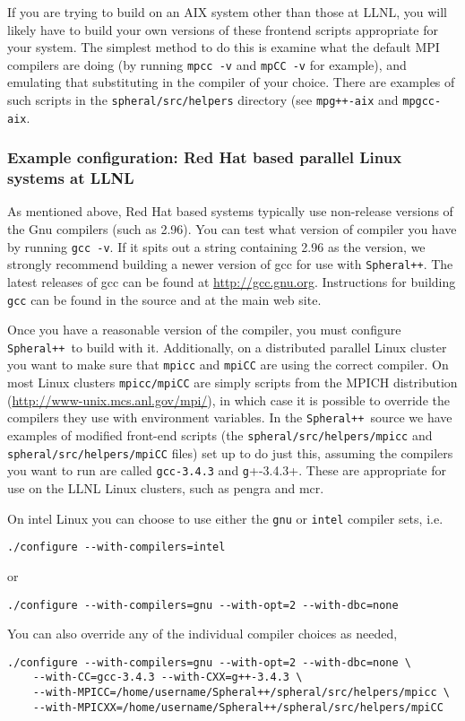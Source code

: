 \documentclass{article}
\newcommand{\Spheral}{{\tt Spheral++}}
\begin{document}
If you are trying to build on an AIX system other than those at LLNL, you will
likely have to build your own versions of these frontend scripts appropriate
for your system.  The simplest method to do this is examine what the default
MPI compilers are doing (by running \verb+mpcc -v+ and \verb+mpCC -v+ for
example), and emulating that substituting in the compiler of your choice.
There are examples of such scripts in the \verb+spheral/src/helpers+ directory
(see \verb.mpg++-aix. and \verb+mpgcc-aix+.

\subsubsection{Example configuration: Red Hat based parallel Linux systems at LLNL}
\label{mcr.sec}

As mentioned above, Red Hat based systems typically use non-release versions of
the Gnu compilers (such as 2.96).  You can test what version of compiler you
have by running \verb+gcc -v+.  If it spits out a string containing 2.96 as the
version, we strongly recommend building a newer version of gcc for use with
\Spheral.  The latest releases of gcc can be found at \url{http://gcc.gnu.org}.
Instructions for building \verb+gcc+ can be found in the source and at the main
web site.

Once you have a reasonable version of the compiler, you must configure
\Spheral\ to build with it.  Additionally, on a distributed parallel Linux
cluster you want to make sure that \verb+mpicc+ and \verb+mpiCC+ are using the
correct compiler.  On most Linux clusters \verb+mpicc/mpiCC+ are simply scripts
from the MPICH distribution (\url{http://www-unix.mcs.anl.gov/mpi/}), in which
case it is possible to override the compilers they use with environment
variables.  In the \Spheral\ source we have examples of modified front-end
scripts (the {\tt spheral/src/helpers/mpicc} and
\verb+spheral/src/helpers/mpiCC+ files) set up to do just this, assuming the
compilers you want to run are called \verb+gcc-3.4.3+ and \verb+g++-3.4.3+.
These are appropriate for use on the LLNL Linux clusters, such as pengra and
mcr.

On intel Linux you can choose to use either the \verb+gnu+ or \verb+intel+
compiler sets, i.e.
\begin{verbatim}
./configure --with-compilers=intel
\end{verbatim}
or
\begin{verbatim}
./configure --with-compilers=gnu --with-opt=2 --with-dbc=none
\end{verbatim}
You can also override any of the individual compiler choices as needed,
\begin{verbatim}
./configure --with-compilers=gnu --with-opt=2 --with-dbc=none \
    --with-CC=gcc-3.4.3 --with-CXX=g++-3.4.3 \
    --with-MPICC=/home/username/Spheral++/spheral/src/helpers/mpicc \
    --with-MPICXX=/home/username/Spheral++/spheral/src/helpers/mpiCC
\end{verbatim}
\end{document}
